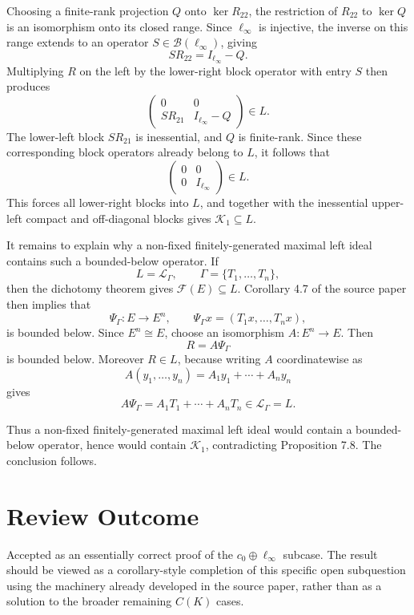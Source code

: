 \documentclass[11pt]{article}
\begin{document}
Choosing a finite-rank projection \(Q\) onto \(\ker R_{22}\), the restriction of \(R_{22}\) to \(\ker Q\) is an isomorphism onto its closed range. Since \(\ell_\infty\) is injective, the inverse on this range extends to an operator \(S\in\mathcal B(\ell_\infty)\), giving
\[
SR_{22}=I_{\ell_\infty}-Q.
\]
Multiplying \(R\) on the left by the lower-right block operator with entry \(S\) then produces
\[
\begin{pmatrix}
0&0\\
SR_{21}&I_{\ell_\infty}-Q
\end{pmatrix}\in L.
\]
The lower-left block \(SR_{21}\) is inessential, and \(Q\) is finite-rank. Since these corresponding block operators already belong to \(L\), it follows that
\[
\begin{pmatrix}
0&0\\
0&I_{\ell_\infty}
\end{pmatrix}\in L.
\]
This forces all lower-right blocks into \(L\), and together with the inessential upper-left compact and off-diagonal blocks gives \(\mathcal K_1\subseteq L\).

It remains to explain why a non-fixed finitely-generated maximal left ideal contains such a bounded-below operator. If
\[
L=\mathscr L_\Gamma,\qquad \Gamma=\{T_1,\ldots,T_n\},
\]
then the dichotomy theorem gives \(\mathcal F(E)\subseteq L\). Corollary 4.7 of the source paper then implies that
\[
\Psi_\Gamma:E\to E^n,\qquad
\Psi_\Gamma x=(T_1x,\ldots,T_nx),
\]
is bounded below. Since \(E^n\cong E\), choose an isomorphism \(A:E^n\to E\). Then
\[
R=A\Psi_\Gamma
\]
is bounded below. Moreover \(R\in L\), because writing \(A\) coordinatewise as
\[
A(y_1,\ldots,y_n)=A_1y_1+\cdots+A_ny_n
\]
gives
\[
A\Psi_\Gamma=A_1T_1+\cdots+A_nT_n\in\mathscr L_\Gamma=L.
\]

Thus a non-fixed finitely-generated maximal left ideal would contain a bounded-below operator, hence would contain \(\mathcal K_1\), contradicting Proposition 7.8. The conclusion follows.

\section*{Review Outcome}

Accepted as an essentially correct proof of the \(c_0\oplus\ell_\infty\) subcase. The result should be viewed as a corollary-style completion of this specific open subquestion using the machinery already developed in the source paper, rather than as a solution to the broader remaining \(C(K)\) cases.
\end{document}
